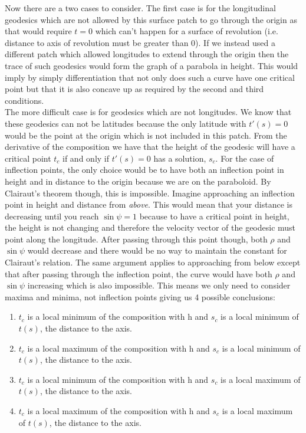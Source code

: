 \documentclass[a4paper, 11pt]{article}
\begin{document}
	\noindent Now there are a two cases to consider. The first case is for the longitudinal geodesics which are not allowed by this surface patch to go through the origin as that would require $t=0$ which can't happen for a surface of revolution (i.e. distance to axis of revolution must be greater than 0). If we instead used a different patch which allowed longitudes to extend through the origin then the trace of such geodesics would form the graph of a parabola in height. This would imply by simply differentiation that not only does such a curve have one critical point but that it is also concave up as required by the second and third conditions.\\ 
	
	\noindent The more difficult case is for geodesics which are not longitudes. We know that these geodesics can not be latitudes because the only latitude with $t'(s) = 0$ would be the point at the origin which is not included in this patch. From the derivative of the composition we have that the height of the geodesic will have a critical point $t_c$ if and only if $t'(s) = 0$ has a solution, $s_c$. For the case of inflection points, the only choice would be to have both an inflection point in height and in distance to the origin because we are on the paraboloid. By Clairaut's theorem though, this is impossible. Imagine approaching an inflection point in height and distance from \textit{above}. This would mean that your distance is decreasing until you reach $\sin\psi = 1$ because to have a critical point in height, the height is not changing and therefore the velocity vector of the geodesic must point along the longitude. After passing through this point though, both $\rho$ and $\sin\psi$ would decrease and there would be no way to maintain the constant for Clairaut's relation. The same argument applies to approaching from below except that after passing through the  inflection point, the curve would have both $\rho$ and $\sin\psi$ increasing which is also impossible. This means we only need to consider maxima and minima, not inflection points giving us 4 possible conclusions:
		\begin{enumerate}
			\item $t_c$ is a local minimum of the composition with h and $s_c$ is a local minimum of $t(s)$, the distance to the axis. 
			\item $t_c$ is a local maximum of the composition with h and $s_c$ is a local minimum of $t(s)$, the distance to the axis.
			\item $t_c$ is a local minimum of the composition with h and $s_c$ is a local maximum of $t(s)$, the distance to the axis.
			\item $t_c$ is a local maximum of the composition with h and $s_c$ is a local maximum of $t(s)$, the distance to the axis.
		\end{enumerate}
\end{document}
